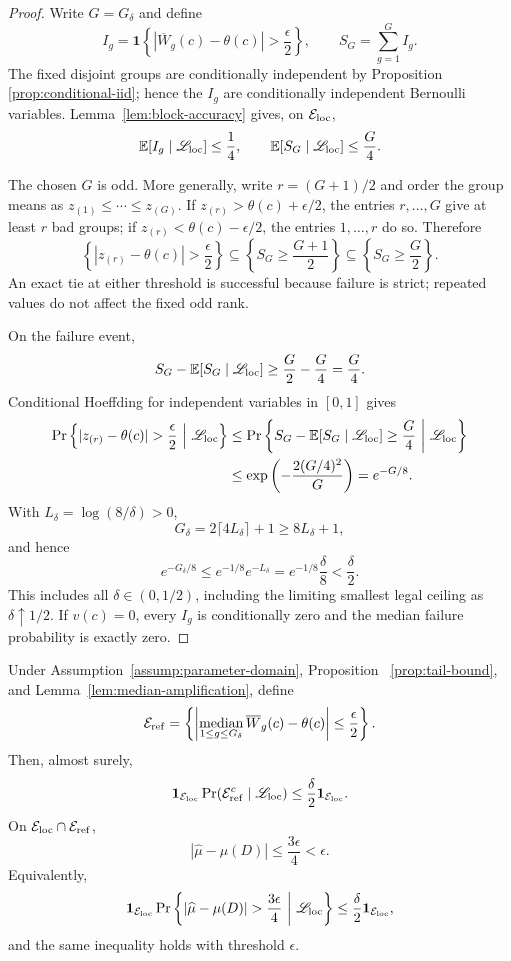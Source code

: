 \begin{proof}
Write $G=G_\delta$ and define
\[
 I_g=\mathbf1\left\{|\overline W_g(c)-\theta(c)|>\frac\epsilon2\right\},
 \qquad S_G=\sum_{g=1}^GI_g.
\]
The fixed disjoint groups are conditionally independent by Proposition~
\ref{prop:conditional-iid}; hence the $I_g$ are conditionally independent
Bernoulli variables.  Lemma~\ref{lem:block-accuracy} gives, on
$\mathcal E_{\rm loc}$,
\[
 \mathbb E[I_g\mid\mathscr L_{\rm loc}]\leq\frac14,
 \qquad
 \mathbb E[S_G\mid\mathscr L_{\rm loc}]\leq\frac G4.
\]

The chosen $G$ is odd.  More generally, write $r=(G+1)/2$ and order the
group means as $z_{(1)}\leq\cdots\leq z_{(G)}$.  If
$z_{(r)}>\theta(c)+\epsilon/2$, the entries $r,\ldots,G$ give at least $r$
bad groups; if $z_{(r)}<\theta(c)-\epsilon/2$, the entries $1,\ldots,r$
do so.  Therefore
\[
 \left\{|z_{(r)}-\theta(c)|>\frac\epsilon2\right\}
 \subseteq\left\{S_G\geq\frac{G+1}{2}\right\}
 \subseteq\left\{S_G\geq\frac G2\right\}.
\]
An exact tie at either threshold is successful because failure is strict;
repeated values do not affect the fixed odd rank.

On the failure event,
\[
 S_G-\mathbb E[S_G\mid\mathscr L_{\rm loc}]
 \geq\frac G2-\frac G4=\frac G4.
\]
Conditional Hoeffding for independent variables in $[0,1]$ gives
\[
\begin{aligned}
 \Pr\left\{|z_{(r)}-\theta(c)|>\frac\epsilon2
 \ \middle|\ \mathscr L_{\rm loc}\right\}
 &\leq\Pr\left\{S_G-\mathbb E[S_G\mid\mathscr L_{\rm loc}]
 \geq\frac G4\ \middle|\ \mathscr L_{\rm loc}\right\}\\
 &\leq\exp\left(-\frac{2(G/4)^2}{G}\right)=e^{-G/8}.
\end{aligned}
\]
With $L_\delta=\log(8/\delta)>0$,
\[
 G_\delta=2\lceil4L_\delta\rceil+1\geq8L_\delta+1,
\]
and hence
\[
 e^{-G_\delta/8}\leq e^{-1/8}e^{-L_\delta}
 =e^{-1/8}\frac\delta8<\frac\delta2.
\]
This includes all $\delta\in(0,1/2)$, including the limiting smallest legal
ceiling as $\delta\uparrow1/2$.  If $v(c)=0$, every $I_g$ is conditionally
zero and the median failure probability is exactly zero.
\end{proof}

\begin{proposition}
\label{prop:conditional-accuracy}
Under Assumption~\ref{assump:parameter-domain}, Proposition~
\ref{prop:tail-bound}, and Lemma~\ref{lem:median-amplification}, define
\[
 \mathcal E_{\rm ref}=\left\{
 \left|\mathop{\rm median}_{1\leq g\leq G_\delta}\overline W_g(c)
 -\theta(c)\right|\leq\frac\epsilon2\right\}.
\]
Then, almost surely,
\[
 \mathbf1_{\mathcal E_{\rm loc}}
 \Pr(\mathcal E_{\rm ref}^c\mid\mathscr L_{\rm loc})
 \leq\frac\delta2\mathbf1_{\mathcal E_{\rm loc}}.
\]
On $\mathcal E_{\rm loc}\cap\mathcal E_{\rm ref}$,
\[
 |\widehat\mu-\mu(D)|\leq\frac{3\epsilon}{4}<\epsilon.
\]
Equivalently,
\[
 \mathbf1_{\mathcal E_{\rm loc}}
 \Pr\left\{|\widehat\mu-\mu(D)|>\frac{3\epsilon}{4}
 \ \middle|\ \mathscr L_{\rm loc}\right\}
 \leq\frac\delta2\mathbf1_{\mathcal E_{\rm loc}},
\]
and the same inequality holds with threshold $\epsilon$.
\end{proposition}

